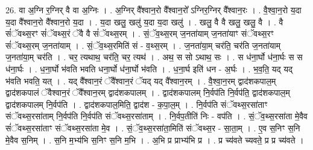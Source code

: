 \documentclass[17pt]{extarticle}
\begin{document}
26. वा अ॒ग्नि र॒ग्निर् वै वा अ॒ग्निः । . अ॒ग्निर् वै᳚श्वान॒रो वै᳚श्वान॒रो᳚ ऽग्निर॒ग्निर् वै᳚श्वान॒रः । . वै॒श्वा॒न॒रो य॒दा य॒दा वै᳚श्वान॒रो वै᳚श्वान॒रो य॒दा । . य॒दा खलु॒ खलु॑ य॒दा य॒दा खलु॑ । . खलु॒ वै वै खलु॒ खलु॒ वै । . वै सं॑ॅवथ्स॒रꣳ सं॑ॅवथ्स॒रं ॅवै वै सं॑ॅवथ्स॒रम् । . सं॒ॅव॒थ्स॒रम् ज॒नता॑याम् ज॒नता॑याꣳ संॅवथ्स॒रꣳ सं॑ॅवथ्स॒रम् ज॒नता॑याम् । . सं॒ॅव॒थ्स॒रमिति॑ सं - व॒थ्स॒रम् । . ज॒नता॑या॒म् चर॑ति॒ चर॑ति ज॒नता॑याम् ज॒नता॑या॒म् चर॑ति । . चर॒ त्यथाथ॒ चर॑ति॒ चर॒ त्यथ॑ । . अथ॒ स सो ऽथाथ॒ सः । . स ध॑ना॒र्घो ध॑ना॒र्घः स स ध॑ना॒र्घः । . ध॒ना॒र्घो भ॑वति भवति धना॒र्घो ध॑ना॒र्घो भ॑वति । . ध॒ना॒र्घ इति॑ धन - अ॒र्घः । . भ॒व॒ति॒ यद् यद् भ॑वति भवति॒ यत् । . यद् वै᳚श्वान॒रं ॅवै᳚श्वान॒रं ॅयद् यद् वै᳚श्वान॒रम् । . वै॒श्वा॒न॒रम् द्वाद॑शकपाल॒म् द्वाद॑शकपालं ॅवैश्वान॒रं ॅवै᳚श्वान॒रम् द्वाद॑शकपालम् । . द्वाद॑शकपालम् नि॒र्वप॑ति नि॒र्वप॑ति॒ द्वाद॑शकपाल॒म् द्वाद॑शकपालम् नि॒र्वप॑ति । . द्वाद॑शकपाल॒मिति॒ द्वाद॑श - क॒पा॒ल॒म् । . नि॒र्वप॑ति संॅवथ्स॒रसा॑ताꣳ संॅवथ्स॒रसा॑ताम् नि॒र्वप॑ति नि॒र्वप॑ति संॅवथ्स॒रसा॑ताम् । . नि॒र्वप॒तीति॑ निः - वप॑ति । . सं॒ॅव॒थ्स॒रसा॑ता मे॒वैव सं॑ॅवथ्स॒रसा॑ताꣳ संॅवथ्स॒रसा॑ता मे॒व । . सं॒ॅव॒थ्स॒रसा॑ता॒मिति॑ संॅवथ्स॒र - सा॒ता॒म् । . ए॒व स॒निꣳ स॒नि मे॒वैव स॒निम् । . स॒नि म॒भ्य॑भि स॒निꣳ स॒नि म॒भि । . अ॒भि प्र प्राभ्य॑भि प्र । . प्र च्य॑वते च्यवते॒ प्र प्र च्य॑वते । \newline
\end{document}
